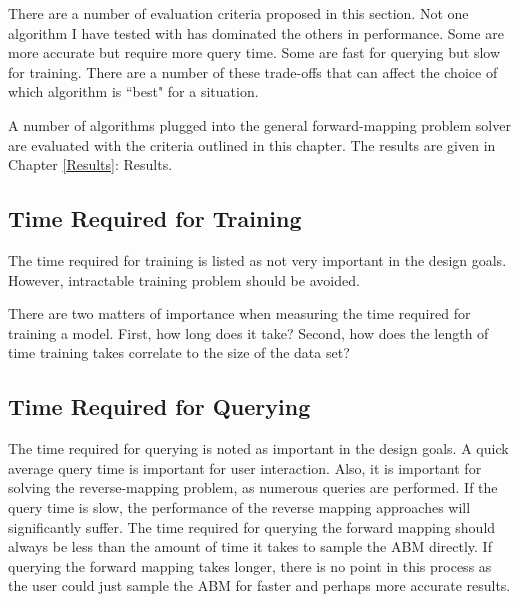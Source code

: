 There are a number of evaluation criteria proposed in this section.
Not one algorithm I have tested with \fw has dominated the others in performance.
Some are more accurate but require more query time.
Some are fast for querying but slow for training.
There are a number of these trade-offs that can affect the choice of which algorithm is ``best" for a situation.

A number of algorithms plugged into the general \fw forward-mapping problem solver are evaluated with the criteria outlined in this chapter.
The results are given in Chapter \ref{Results}: Results.


\subsection{Time Required for Training}

The time required for training is listed as not very important in the \fw design goals.
However, intractable training problem should be avoided.

There are two matters of importance when measuring the time required for training a model.
First, how long does it take?
Second, how does the length of time training takes correlate to the size of the data set?




\subsection{Time Required for Querying}

The time required for querying is noted as important in the design goals.
A quick average query time is important for user interaction.
Also, it is important for solving the reverse-mapping problem, as numerous queries are performed.
If the query time is slow, the performance of the reverse mapping approaches will significantly suffer.
The time required for querying the forward mapping should always be less than the amount of time it takes to sample the ABM directly.
If querying the forward mapping takes longer, there is no point in this process as the user could just sample the ABM for faster and perhaps more accurate results.

